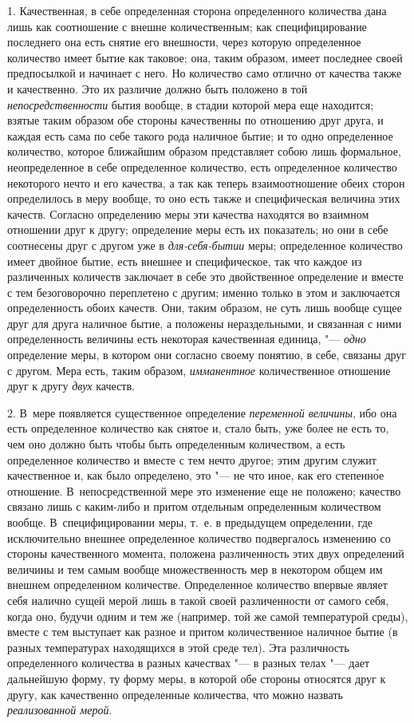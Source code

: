 1. Качественная, в себе определенная сторона
определенного количества дана лишь как соотношение с внешне количественным;
как специфицирование последнего она есть снятие его внешности, через
которую определенное количество имеет бытие как таковое; она, таким
образом, имеет последнее своей предпосылкой и начинает с него. Но
количество само отлично от качества также и качественно. Это их различие
должно быть положено в той {\em непосредственности}
бытия вообще, в стадии которой мера еще находится; взятые таким образом обе
стороны качественны по отношению друг друга, и каждая есть сама по себе
такого рода наличное бытие; и то одно определенное количество, которое
ближайшим образом представляет собою лишь формальное, неопределенное в себе
определенное количество, есть определенное количество некоторого нечто и
его качества, а так как теперь взаимоотношение обеих сторон определилось в
меру вообще, то оно есть также и специфическая величина этих качеств.
Согласно определению меры эти качества находятся во взаимном отношении друг
к другу; определение меры есть их показатель; но они в себе соотнесены друг
с другом уже в {\em для-себя-бытии} меры; определенное
количество имеет двойное бытие, есть внешнее и специфическое, так что
каждое из различенных количеств заключает в себе это двойственное
определение и вместе с тем безоговорочно переплетено с другим; именно
только в этом и заключается определенность обоих качеств. Они, таким
образом, не суть лишь вообще сущее друг для друга наличное бытие, а
положены нераздельными, и связанная с ними определенность величины есть
некоторая качественная единица, "--- {\em одно}
определение меры, в котором они согласно своему понятию, в себе, связаны
друг с другом. Мера есть, таким образом,
{\em имманентное} количественное отношение друг к другу
{\em двух} качеств.

2. В~мере появляется существенное определение
{\em переменной величины}, ибо она есть определенное
количество как снятое и, стало быть, уже более не есть то, чем оно должно
быть чтобы быть определенным количеством, а есть определенное количество и
вместе с тем нечто другое; этим другим служит качественное и, как было
определено, это "--- не что иное, как его степенн\'{о}е отношение.
В~непосредственной мере это изменение еще не положено; качество связано лишь
с каким-либо и притом отдельным определенным количеством вообще.
В~специфицировании меры, т.~е. в предыдущем определении, где исключительно
внешнее определенное количество подвергалось изменению со стороны
качественного момента, положена различенность этих двух определений
величины и тем самым вообще множественность мер в некотором общем им
внешнем определенном количестве. Определенное количество впервые являет
себя налично сущей мерой лишь в такой своей различенности от самого себя,
когда оно, будучи одним и тем же (например, той же самой температурой
среды), вместе с тем выступает как разное и притом количественное наличное
бытие (в разных температурах находящихся в этой среде тел). Эта различность
определенного количества в разных качествах "--- в разных телах "--- дает
дальнейшую форму, ту форму меры, в которой обе стороны относятся друг к
другу, как качественно определенные количества, что можно назвать
{\em реализованной мерой}.

